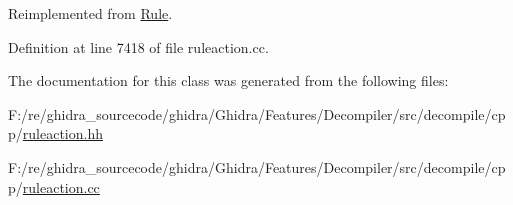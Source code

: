 Reimplemented from \mbox{\hyperlink{class_rule_a4023bfc7825de0ab866790551856d10e}{Rule}}.



Definition at line 7418 of file ruleaction.\+cc.



The documentation for this class was generated from the following files\+:\begin{DoxyCompactItemize}
\item 
F\+:/re/ghidra\+\_\+sourcecode/ghidra/\+Ghidra/\+Features/\+Decompiler/src/decompile/cpp/\mbox{\hyperlink{ruleaction_8hh}{ruleaction.\+hh}}\item 
F\+:/re/ghidra\+\_\+sourcecode/ghidra/\+Ghidra/\+Features/\+Decompiler/src/decompile/cpp/\mbox{\hyperlink{ruleaction_8cc}{ruleaction.\+cc}}\end{DoxyCompactItemize}
